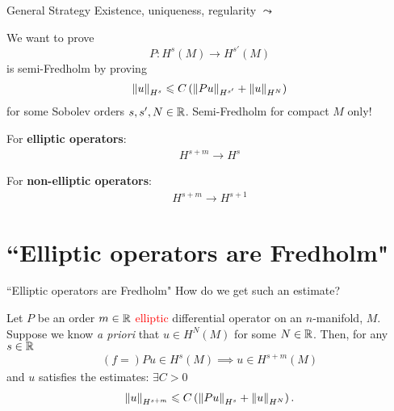\documentclass{beamer}
\begin{document}
\begin{frame}{General Strategy}
Existence, uniqueness, regularity $\leadsto$ 
\begin{block}{} 
    We want to prove 
    $$P: H^s(M) \to H^{s'}(M)$$
     is semi-Fredholm by proving 
     \begin{align*}
     \norm[u]_{H^s} \leq C \brac{\norm[Pu]_{H^{s'}} + \norm[u]_{H^{N}}}
     \end{align*} 
     for some Sobolev orders $s, s', N \in \R$. Semi-Fredholm for compact $M$ only! 
\end{block}

For \textbf{elliptic operators}: 
\begin{align*}
H^{s + m} \to H^{s}
\end{align*}

For \textbf{non-elliptic operators}: 
\begin{align*}
H^{s + m} \to H^{s + 1}
\end{align*}
\end{frame} 


\section{``Elliptic operators are Fredholm"} 
\begin{frame}{``Elliptic operators are Fredholm"} 
How do we get such an estimate? 

\begin{theorem}
    Let $P$ be an order $m \in \R$ \textcolor<2->{red}{ elliptic}
    differential operator on an $n$-manifold, $M$. Suppose we know \textit{a priori} that $u \in H^{N}(M)$ for some $N \in \R$. Then, for any $s \in \R$
    \begin{align*}
    (f = ) Pu \in H^{s}(M) \implies u \in H^{s + m}(M)
    \end{align*}
    and $u$ satisfies the estimates: $\exists C > 0$
    \begin{align*}
    \norm[u]_{H^{s + m}} \leq C \brac{\norm[Pu]_{H^s} + \norm[u]_{H^N}}. 
    \end{align*}
\end{theorem}

\end{frame} 
\end{document}
